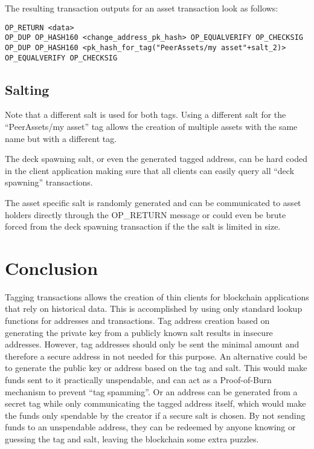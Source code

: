 \documentclass[a4paper,10pt]{article}
\begin{document}
The resulting transaction outputs for an asset transaction look as follows:
\begin{scriptsize}\begin{verbatim}
OP_RETURN <data>
OP_DUP OP_HASH160 <change_address_pk_hash> OP_EQUALVERIFY OP_CHECKSIG
OP_DUP OP_HASH160 <pk_hash_for_tag("PeerAssets/my asset"+salt_2)> OP_EQUALVERIFY OP_CHECKSIG
\end{verbatim}\end{scriptsize}

\subsection{Salting}
Note that a different salt is used for both tags.
Using a different salt for the ``PeerAssets/my asset'' tag allows the creation of multiple assets with the same name but with a different tag.

The deck spawning salt, or even the generated tagged address, can be hard coded in the client application making sure that all clients can easily query all ``deck spawning'' transactions.

The asset specific salt is randomly generated and can be communicated to asset holders directly through the OP\_RETURN message or could even be brute forced from the deck spawning transaction if the the salt is limited in size.


\section{Conclusion}
Tagging transactions allows the creation of thin clients for blockchain applications that rely on historical data.
This is accomplished by using only standard lookup functions for addresses and transactions.
Tag address creation based on generating the private key from a publicly known salt results in insecure addresses.
However, tag addresses should only be sent the minimal amount and therefore a secure address in not needed for this purpose.
An alternative could be to generate the public key or address based on the tag and salt. This would make funds sent to it practically unspendable, and can act as a Proof-of-Burn mechanism to prevent ``tag spamming''.
Or an address can be generated from a secret tag while only communicating the tagged address itself, which would make the funds only spendable by the creator if a secure salt is chosen.
By not sending funds to an unspendable address, they can be redeemed by anyone knowing or guessing the tag and salt, leaving the blockchain some extra puzzles.
\end{document}
